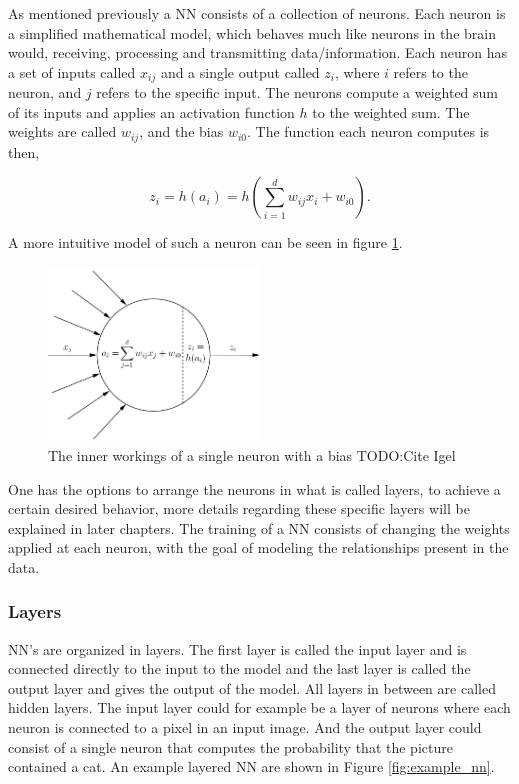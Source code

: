 As mentioned previously a \gls{NN} consists of a collection of neurons. Each
neuron is a simplified mathematical model, which behaves much like neurons in
the brain would, receiving, processing and transmitting data/information. Each
neuron has a set of inputs called $x_{ij}$ and a single output called $z_i$, where $i$
refers to the neuron, and $j$ refers to the specific input. The
neurons compute a weighted sum of its inputs and applies an activation function
$h$ to the weighted sum. The weights are called $w_{ij}$, and the bias $w_{i0}$. The
function each neuron computes is then,

\begin{equation}\label{eq:neuron}
    z_i = h(a_i) = h\left(
        \sum_{i = 1}^d w_{ij}x_i + w_{i0}
    \right).
\end{equation}

A more intuitive model of such a neuron can be seen in figure \ref{fig:neuron}.

\begin{figure}
    \centering
    \includegraphics[width=0.5\textwidth]{./pictures/method/Neuron.png}
    \caption{The inner workings of a single neuron with a bias TODO:Cite Igel}
    \label{fig:neuron}
\end{figure}

One has the options to arrange the neurons in what is called layers, to achieve
a certain desired behavior, more details regarding these specific layers will
be explained in later chapters. The training of a \gls{NN} consists of changing
the weights applied at each neuron, with the goal of modeling the relationships
present in the data.


\subsubsection{Layers} \label{subsubsec:layers}

\gls{NN}'s are organized in layers. The first layer is called the input layer
and is connected directly to the input to the model and the last layer is called
the output layer and gives the output of the model. All layers in between are
called hidden layers. The input layer could for example be a layer of neurons
where each neuron is connected to a pixel in an input image. And the output
layer could consist of a single neuron that computes the probability that the
picture contained a cat. An example layered \gls{NN} are shown in Figure
\ref{fig:example_nn}.

